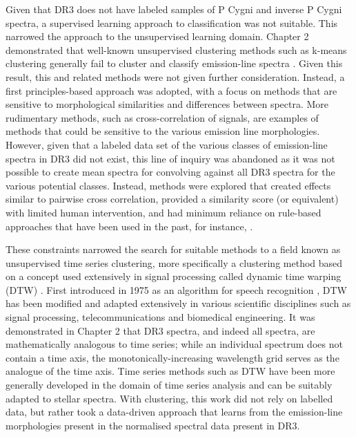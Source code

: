 Given that DR3 does not have labeled samples of P Cygni and inverse P Cygni spectra, a supervised learning approach to classification was not suitable. This narrowed the approach to the unsupervised learning domain. Chapter 2 demonstrated that well-known unsupervised clustering methods such as k-means clustering generally fail to cluster and classify emission-line spectra \citep{garcia2018machine}. Given this result, this and related methods were not given further consideration. Instead, a first principles-based approach was adopted, with a focus on methods that are sensitive to morphological similarities and differences between spectra. More rudimentary methods, such as cross-correlation of signals, are examples of methods that could be sensitive to the various emission line morphologies. However, given that a labeled data set of the various classes of emission-line spectra in DR3 did not exist, this line of inquiry was abandoned as it was not possible to create mean spectra for convolving against all DR3 spectra for the various potential classes. Instead, methods were explored that created effects similar to pairwise cross correlation, provided a similarity score (or equivalent) with limited human intervention, and had minimum reliance on rule-based approaches that have been used in the past, for instance, \citep{traven2015gaia}. 

These constraints narrowed the search for suitable methods to a field known as unsupervised time series clustering, more specifically a clustering method based on a concept used extensively in signal processing called dynamic time warping (DTW) \citep{kruskal1983overview}. First introduced in 1975 as an algorithm for speech recognition \citep{itakura1975minimum}, DTW has been modified and adapted extensively in various scientific disciplines such as signal processing, telecommunications and biomedical engineering. It was demonstrated in Chapter 2 that DR3 spectra, and indeed all spectra, are mathematically analogous to time series; while an individual spectrum does not contain a time axis, the monotonically-increasing wavelength grid serves as the analogue of the time axis. Time series methods such as DTW have been more generally developed in the domain of time series analysis \citep{nielsen2019practical} and can be suitably adapted to stellar spectra. With clustering, this work did not rely on labelled data, but rather took a data-driven approach that learns from the emission-line morphologies present in the normalised spectral data present in DR3.

